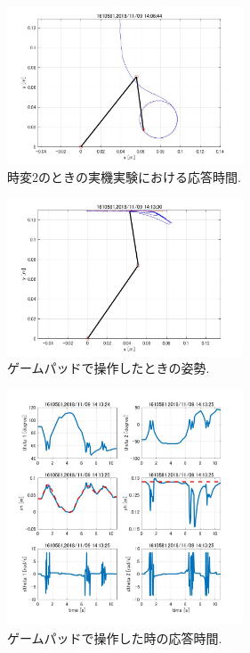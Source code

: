\documentclass[twocolumn, 10pt,a4j]{jsarticle}
\begin{document}
\begin{enumerate}
        \begin{figure}[H]
          \begin{center}
            \includegraphics[width=7cm]{../img/kadai45/jpg_zissai_hand_zihen_auto_zikan_1.jpg}
            \caption{時変2のときの実機実験における応答時間.}
          \end{center}
        \end{figure}
        \begin{figure}[H]
          \begin{center}
            \includegraphics[width=7cm]{../img/kadai45/jpg_game_pad_hand_zihen_saisyu_sise.jpg}
            \caption{ゲームパッドで操作したときの姿勢.}
          \end{center}
        \end{figure}
        
        \begin{figure}[H]
          \begin{center}
            \includegraphics[width=7cm]{../img/kadai45/game_outo.jpg}
            \caption{ゲームパッドで操作した時の応答時間.}
          \end{center}
        \end{figure}
    \end{enumerate}
  
\end{document}
